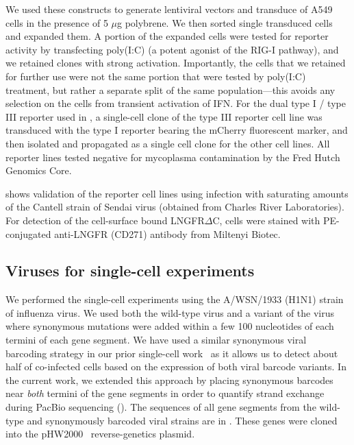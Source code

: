\documentclass[9pt,lineno]{elife}
\begin{document}
We used these constructs to generate lentiviral vectors and transduce of A549 cells in the presence of 5 $\mu$g polybrene.
We then sorted single transduced cells and expanded them.
A portion of the expanded cells were tested for reporter activity by transfecting poly(I:C) (a potent agonist of the RIG-I pathway), and we retained clones with strong activation.
Importantly, the cells that we retained for further use were not the same portion that were tested by poly(I:C) treatment, but rather a separate split of the same population---this avoids any selection on the cells from transient activation of IFN.
For the dual type I / type III reporter used in , a single-cell clone of the type III reporter cell line was transduced with the type I reporter bearing the mCherry fluorescent marker, and then isolated and propagated as a single cell clone for the other cell lines.
All reporter lines tested negative for mycoplasma contamination by the Fred Hutch Genomics Core.

 shows validation of the reporter cell lines using infection with saturating amounts of the Cantell strain of Sendai virus (obtained from Charles River Laboratories).
For detection of the cell-surface bound LNGFR$\Delta$C, cells were stained with PE-conjugated anti-LNGFR (CD271) antibody from Miltenyi Biotec.

\subsection{Viruses for single-cell experiments}
We performed the single-cell experiments using the A/WSN/1933 (H1N1) strain of influenza virus.
We used both the wild-type virus and a variant of the virus where synonymous mutations were added within a few 100 nucleotides of each termini of each gene segment.
We have used a similar synonymous viral barcoding strategy in our prior single-cell work~\citep{russell2018extreme} as it allows us to detect about half of co-infected cells based on the expression of both viral barcode variants.
In the current work, we extended this approach by placing synonymous barcodes near \emph{both} termini of the gene segments in order to quantify strand exchange during PacBio sequencing ().
The sequences of all gene segments from the wild-type and synonymously barcoded viral strains are in .
These genes were cloned into the pHW2000~\citep{hoffmann2000dna} reverse-genetics plasmid.
\end{document}
